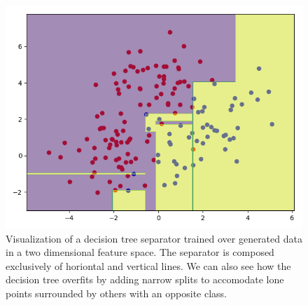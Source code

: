                 \begin{figure}
                    \centering
                    \includegraphics[width=.5\textwidth]{images/related_work/decision_tree_separator}
                    \caption{
                        \label{fig::decision_tree_separator} Visualization of a decision tree separator trained over generated data in a two dimensional feature space.
                        The separator is composed exclusively of horiontal and vertical lines.
                        We can also see how the decision tree overfits by adding narrow splits to accomodate lone points surrounded by others with an opposite class.
                    }
                \end{figure}

